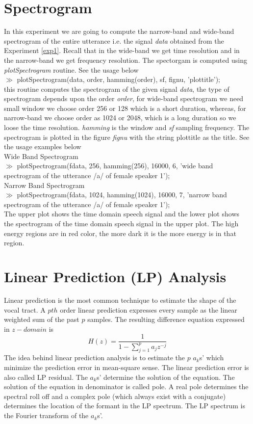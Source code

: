 \section{Spectrogram}
\label{exp5}
In this experiment we are going to compute the narrow-band and
wide-band spectrogram of the entire utterance i.e. the signal {\it
data} obtained from the Experiment \ref{exp1}. Recall that in the
wide-band we get time
resolution and in the narrow-band we get frequency resolution. The
spectorgam is computed using {\it plotSpectrogram} routine. See the
usage below\\[1ex]
\noindent
$\gg$ plotSpectrogram(data, order, hamming(order), sf, fignu,
'plottitle');\\[1ex]
\noindent
this routine computes the spectrogram of the given signal {\it data},
the type of spectrogram depends upon the order {\it order}, for wide-band
spectrogram we need small window we choose order 256 or 128 which is a
short duration, whereas, for narrow-band we choose order as 1024 or
2048, which is a long duration so we loose the time resolution. {\it
hamming} is the window and {\it sf} sampling frequency. The 
spectrogram is plotted in the figure {\it fignu} with the string
plottitle as the title. See the usage examples below\\[1ex]
\noindent
Wide Band Spectrogram\\ $\gg$ plotSpectrogram(fdata, 256, hamming(256),
16000, 6, 'wide band spectrogram of the utterance /a/ of female
speaker 1');\\[1ex]
\noindent
Narrow Band Spectrogram\\ $\gg$ plotSpectrogram(fdata, 1024,
hamming(1024), 16000, 7, 'narrow band spectrogram of the utterance /a/
of female speaker 1');\\[1ex]
\noindent
The upper plot shows the time domain speech signal and the lower plot
shows the spectrogram of the time domain speech signal in the upper
plot. The high energy regions are in red color, the more dark it is
the more energy is in that region.

\section{Linear Prediction (LP) Analysis}
\label{exp6}
Linear prediction is the most common technique to estimate the
shape of the vocal tract. A $pth$ order linear prediction expresses
every sample as the linear weighted sum of the past $p$ samples. The
resulting difference equation expressed in $z-domain$ is
\begin{equation}
H(z) = \frac{1}{1 - \sum_{j = 1}^{p} a_{j}z^{-j}}
\end{equation}
The idea behind
linear prediction analysis is to estimate the $p$ $a_{k}$s' 
which minimize the prediction error in mean-square sense. The linear
prediction error is also called LP residual. The $a_{k}$s'
determine the solution of the equation. The solution of the equation
in denominator is called pole. A real pole determines the spectral
roll off and a complex pole (which always exist with a conjugate)
determines the location of the formant in the LP spectrum. The LP
spectrum is the Fourier transform of the $a_{k}$s'.
\noindent
